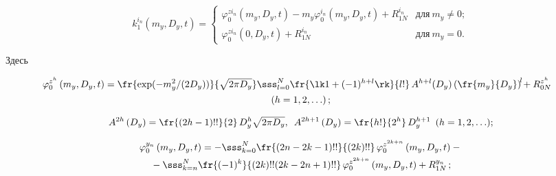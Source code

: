   \begin{equation}

  k_1^{i_n} \left(m_y, D_y,t\right) =\!

  \begin{cases}\!

   \varphi_0^{zi_n} \left(m_y, D_y,t\right) - 

  m_y \varphi_0^{i_n} \left(m_y, D_y,t\right)+R_{1N}^{i_n}  &\!\!\!\! \mbox{для}\ m_y \ne 0;

\\

  \varphi_0^{zi_n} \left(0, D_y,t\right) +

 R_{1N}^{i_n}  &\!\!\!\! \mbox{для}\ m_y =0.

 \end{cases}\! \!\! \!

 \label{e3.4-sin}

 \end{equation}

Здесь

 \begin{multline}

 \hspace*{-8pt}\varphi_0^{z^h} \left(m_y, D_y,t\right) = 

 \fr{\exp (-m_y^2 /(2D_y))}{\sqrt{2\pi D_y}} \sss_{l=0}^N \fr{\lk 1+ (-1)^{h+l}\rk}{l!}\,

  A^{h+l} (D_y) \left( \fr{m_y}{D_y}\right)^{\!l}\!+R_{0N}^{z^h} \\ (h=1,2,\ldots)\,;

  \label{e3.5-sin}

  \end{multline}

 \begin{equation}

\hspace*{-1mm}A^{2h} \left(D_y\right) = \fr{(2h-1)!!}{2}\, D_y^h \sqrt{2\pi D_y}, \enskip 

 A^{2h+1} \left(D_y\right) = \fr{h!}{2^h }\,D_y^{h+1}\enskip (h=1,2,\ldots);\!\!

 \label{e3.6-sin}

 \end{equation}



\vspace*{-12pt}



\noindent

\begin{multline}

\varphi_0^{y_n} \left(m_y, D_y,t\right) = -\sss_{k=0}^N \fr{(2n - 2k-1)!!}{(2k)!!}\,

\varphi_0^{z^{2k+n}} \left(m_y, D_y,t\right)-{}\\

{}-\sss_{k=n}^N \fr{(-1)^k}{(2k)!! (2k-2n+1)!!}\, \varphi_0^{z^{2k+n}} 

\left(m_y, D_y,t\right)+R_{1N}^{y_n} \,;

\label{e3.7-sin}

\end{multline}

